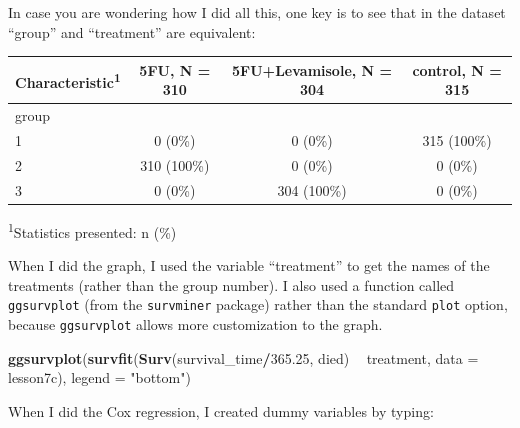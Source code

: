 \documentclass[]{book}
\newenvironment{Shaded}{\begin{snugshade}}{\end{snugshade}}
\newcommand{\DataTypeTok}[1]{\textcolor[rgb]{0.13,0.29,0.53}{#1}}
\newcommand{\FloatTok}[1]{\textcolor[rgb]{0.00,0.00,0.81}{#1}}
\newcommand{\KeywordTok}[1]{\textcolor[rgb]{0.13,0.29,0.53}{\textbf{#1}}}
\newcommand{\NormalTok}[1]{#1}
\newcommand{\OperatorTok}[1]{\textcolor[rgb]{0.81,0.36,0.00}{\textbf{#1}}}
\newcommand{\StringTok}[1]{\textcolor[rgb]{0.31,0.60,0.02}{#1}}
\begin{document}
In case you are wondering how I did all this, one key is to see that in
the dataset ``group'' and ``treatment'' are equivalent:

\begin{Shaded}
\end{Shaded}

\captionsetup[table]{labelformat=empty,skip=1pt}
\begin{longtable}{lccc}
\toprule
\textbf{Characteristic}\textsuperscript{1} & \textbf{5FU}, N = 310 & \textbf{5FU+Levamisole}, N = 304 & \textbf{control}, N = 315 \\ 
\midrule
group &  &  &  \\ 
1 & 0 (0\%) & 0 (0\%) & 315 (100\%) \\ 
2 & 310 (100\%) & 0 (0\%) & 0 (0\%) \\ 
3 & 0 (0\%) & 304 (100\%) & 0 (0\%) \\ 
\bottomrule
\end{longtable}
\vspace{-5mm}
\begin{minipage}{\linewidth}
\textsuperscript{1}Statistics presented: n (\%) \\ 
\end{minipage}

When I did the graph, I used the variable ``treatment'' to get the names
of the treatments (rather than the group number). I also used a function
called \texttt{ggsurvplot} (from the \texttt{survminer} package) rather
than the standard \texttt{plot} option, because \texttt{ggsurvplot}
allows more customization to the graph.

\begin{Shaded}
\begin{Highlighting}[]
\KeywordTok{ggsurvplot}\NormalTok{(}\KeywordTok{survfit}\NormalTok{(}\KeywordTok{Surv}\NormalTok{(survival_time}\OperatorTok{/}\FloatTok{365.25}\NormalTok{, died) }\OperatorTok{~}\StringTok{ }\NormalTok{treatment, }\DataTypeTok{data =}\NormalTok{ lesson7c),}
           \DataTypeTok{legend =} \StringTok{"bottom"}\NormalTok{)}
\end{Highlighting}
\end{Shaded}

When I did the Cox regression, I created dummy variables by typing:
\end{document}
